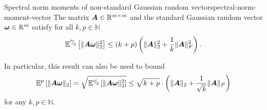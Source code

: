 \begin{lemma}{Spectral norm moments of non-standard Gaussian random vector}{spectral-norm-moment-vector}
    The matrix $\boldsymbol{A} \in \mathbb{R}^{m \times m}$ and the standard Gaussian random vector $\boldsymbol{\omega} \in \mathbb{R}^{m}$ satisfy for all $k,p \in \mathbb{N}$ 
    \begin{equation}
        \mathbb{E}^{{}^{p}{\mskip -5mu/\mskip -3mu}_{2}}\left[ \lVert \boldsymbol{A} \boldsymbol{\omega} \rVert _2^2 \right]
        \leq  (k + p) \left( \lVert \boldsymbol{A} \rVert _2^2 + \frac{1}{k} \lVert \boldsymbol{A} \rVert _F^2 \right).
    \end{equation}
\end{lemma}

\begin{remark}
    In particular, this result can also be used to bound
    \begin{equation}
        \mathbb{E}^{p}\left[ \lVert \boldsymbol{A} \boldsymbol{\omega} \rVert _2 \right] = \sqrt{\mathbb{E}^{{}^{p}{\mskip -5mu/\mskip -3mu}_{2}}\left[ \lVert \boldsymbol{A} \boldsymbol{\omega} \rVert _2^2 \right]} \leq \sqrt{k + p} \cdot \left(\lVert \boldsymbol{A} \rVert _2 + \frac{1}{\sqrt{k}}\lVert \boldsymbol{A} \rVert _F\right)
    \end{equation}
    for any $k,p \in \mathbb{N}$.
\end{remark}

